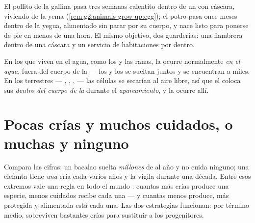 \begin{example}\label{ex:g4:animal-reproduction:nurseries}
El pollito de la gallina pasa tres semanas calentito dentro de un
 con cáscara, viviendo de la yema
(\cref{rem:g2:animals-grow-up:egg}); el potro pasa once meses dentro
de la yegua, alimentado sin parar por su cuerpo, y nace listo para
ponerse de pie en menos de una hora. El mismo objetivo, dos
guarderías: una fiambrera dentro de una cáscara y un servicio de
habitaciones por dentro.
\end{example}

\begin{proposition}\label{prop:g4:animal-reproduction:where}
En los que viven en el agua, como los  y las ranas, la
 ocurre normalmente \emph{en el agua}, fuera del cuerpo de
la  --- los  y los  se sueltan juntos y se
encuentran a miles. En los  terrestres --- , ,
,  --- las células se secarían al aire libre, así que
el  coloca sus  \emph{dentro del cuerpo de la
} durante el \emph{apareamiento}, y la
 ocurre allí.
\end{proposition}
\admitted

\section{Pocas crías y muchos cuidados, o muchas y ninguno}

\begin{proposition}\label{prop:g4:animal-reproduction:strategies}
Compara las cifras: un bacalao suelta \emph{millones} de  al año
y no cuida ninguno; una elefanta tiene \emph{una} cría cada varios
años y la vigila durante una década. Entre esos extremos vale una
regla en todo el mundo : cuantas más crías produce una especie,
menos cuidados recibe cada una --- y cuantas menos produce, más
protegida y alimentada está cada una. Las dos estrategias funcionan:
por término medio, sobreviven bastantes crías para sustituir a los
progenitores.
\end{proposition}
\admitted

